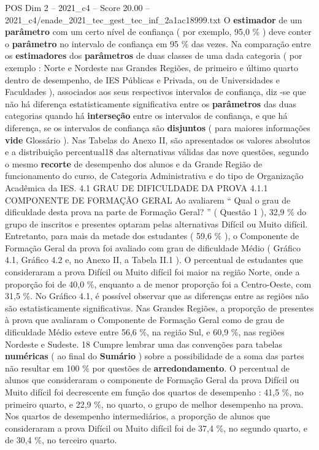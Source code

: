 \begin{textsample}{POS Dim 2 – 2021\_c4 – Score 20.00 – 2021\_c4/enade\_2021\_tec\_gest\_tec\_inf\_2a1ac18999.txt}
O \textbf{estimador} de um \textbf{parâmetro} com um certo nível de confiança ( por exemplo, 95,0 \% ) deve conter o \textbf{parâmetro} no intervalo de confiança em 95 \% das vezes.
Na comparação entre os \textbf{estimadores} dos \textbf{parâmetros} de duas classes de uma dada categoria ( por exemplo : Norte e Nordeste nas Grandes Regiões, de primeiro e último quarto dentro de desempenho, de IES Públicas e Privada, ou de Universidades e Faculdades ), associados aos seus respectivos intervalos de confiança, diz -se que não há diferença estatisticamente significativa entre os \textbf{parâmetros} das duas categorias quando há \textbf{interseção} entre os intervalos de confiança, e que há diferença, se os intervalos de confiança são \textbf{disjuntos} ( para maiores informações \textbf{vide} Glossário ).
Nas Tabelas do Anexo II, são apresentados os valores absolutos e a distribuição percentual18 das alternativas válidas das nove questões, segundo o mesmo \textbf{recorte} de desempenho dos alunos e da Grande Região de funcionamento do curso, de Categoria Administrativa e do tipo de Organização Acadêmica da IES. 4.1 GRAU DE DIFICULDADE DA PROVA 4.1.1 COMPONENTE DE FORMAÇÃO GERAL Ao avaliarem “ Qual o grau de dificuldade desta prova na parte de Formação Geral? ” ( Questão 1 ), 32,9 \% do grupo de inscritos e presentes optaram pelas alternativas Difícil ou Muito difícil.
Entretanto, para mais da metade dos estudantes ( 59,6 \% ), o Componente de Formação Geral da prova foi avaliado com grau de dificuldade Médio ( Gráfico 4.1, Gráfico 4.2 e, no Anexo II, a Tabela II.1 ).
O percentual de estudantes que consideraram a prova Difícil ou Muito difícil foi maior na região Norte, onde a proporção foi de 40,0 \%, enquanto a de menor proporção foi a Centro-Oeste, com 31,5 \%.
No Gráfico 4.1, é possível observar que as diferenças entre as regiões não são estatisticamente significativas.
Nas Grandes Regiões, a proporção de presentes à prova que avaliaram o Componente de Formação Geral como de grau de dificuldade Médio esteve entre 56,6 \%, na região Sul, e 60,9 \%, nas regiões Nordeste e Sudeste. 18 Cumpre lembrar uma das convenções para tabelas \textbf{numéricas} ( ao final do \textbf{Sumário} ) sobre a possibilidade de a soma das partes não resultar em 100 \% por questões de \textbf{arredondamento}.
O percentual de alunos que consideraram o componente de Formação Geral da prova Difícil ou Muito difícil foi decrescente em função dos quartos de desempenho : 41,5 \%, no primeiro quarto, e 22,9 \%, no quarto, o grupo de melhor desempenho na prova.
Nos quartos de desempenho intermediários, a proporção de alunos que consideraram a prova Difícil ou Muito difícil foi de 37,4 \%, no segundo quarto, e de 30,4 \%, no terceiro quarto.

\end{textsample}
